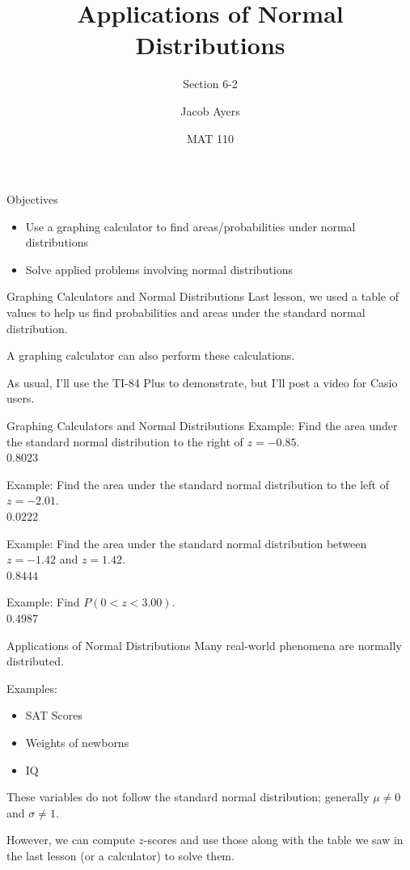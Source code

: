 \documentclass[t, aspectratio=169]{beamer}
\title[6-2]{Applications of Normal Distributions}
\subtitle{Section 6-2}
\author{Jacob Ayers}
\institute{Lesson \#18}
\date{MAT 110}
\newcommand{\?}{\stackrel{?}{=}}
\begin{document}
	
	\begin{frame}
		\titlepage
	\end{frame}
	
	\begin{frame}{Objectives}
		\begin{itemize}
			\item Use a graphing calculator to find areas/probabilities under normal distributions
			\item Solve applied problems involving normal distributions
		\end{itemize}
	\end{frame}

	\begin{frame}{Graphing Calculators and Normal Distributions}
		Last lesson, we used a table of values to help us find probabilities and areas under the standard normal distribution. \pause
		
		A graphing calculator can also perform these calculations. \pause
		
		As usual, I'll use the TI-84 Plus to demonstrate, but I'll post a video for Casio users.
	\end{frame}

	\begin{frame}{Graphing Calculators and Normal Distributions}
		Example: Find the area under the standard normal distribution to the right of $z = -0.85$. \pause \\ $0.8023$ \pause
		
		Example: Find the area under the standard normal distribution to the left of $z = -2.01$. \pause \\ $0.0222$ \pause
		
		Example: Find the area under the standard normal distribution between $z = -1.42$ and $z = 1.42$. \pause \\ $0.8444$ \pause
		
		Example: Find $P(0 < z < 3.00)$. \pause \\ $0.4987$
	\end{frame}

	\begin{frame}{Applications of Normal Distributions}
		Many real-world phenomena are normally distributed. \pause
		
		Examples: \begin{itemize}
			\item SAT Scores
			\item Weights of newborns
			\item IQ
		\end{itemize} \pause
	
		These variables do not follow the standard normal distribution; generally $\mu \neq 0$ and $\sigma \neq 1$. \pause
		
		However, we can compute $z$-scores and use those along with the table we saw in the last lesson (or a calculator) to solve them. 
	\end{frame}
\end{document}
